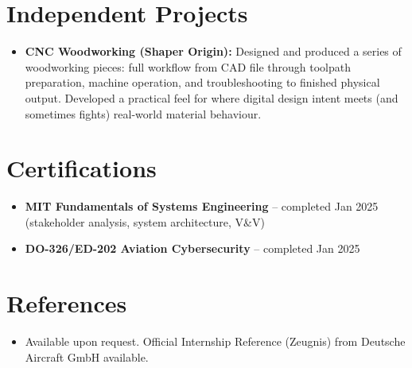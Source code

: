 \documentclass[11pt,a4paper,sans]{moderncv}
\begin{document}

\section{Independent Projects}
\vspace{1pt}
\begin{itemize}
\item \textbf{CNC Woodworking (Shaper Origin):} Designed and produced a series of woodworking pieces: full workflow from CAD file through toolpath preparation, machine operation, and troubleshooting to finished physical output. Developed a practical feel for where digital design intent meets (and sometimes fights) real-world material behaviour.
\end{itemize}


\section{Certifications}
\vspace{1pt}
\begin{itemize}
\item{\textbf{MIT Fundamentals of Systems Engineering} -- completed Jan 2025 (stakeholder analysis, system architecture, V\&V)}
\item{\textbf{DO-326/ED-202 Aviation Cybersecurity} -- completed Jan 2025}
\end{itemize}


\section{References}
\vspace{1pt}
\begin{itemize}
\item{Available upon request. Official Internship Reference (Zeugnis) from Deutsche Aircraft GmbH available.}
\end{itemize}
\end{document}
